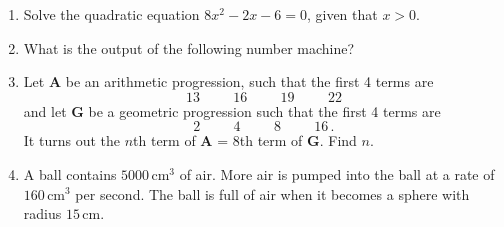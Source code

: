 \documentclass[12pt,a4paper]{article}
\begin{document}
\begin{enumerate}
    \item Solve the quadratic equation $8x^2 - 2x - 6 = 0$, given that $x > 0$.
    
    \vspace{3cm}

    \item What is the output of the following number machine?
\begin{center}
\end{center}


\vspace{3cm}

    \item Let $\mathbf{A}$ be an arithmetic progression, such that the first 4 terms are
    \begin{equation*}
        13 \hspace{1cm} 16 \hspace{1cm} 19 \hspace{1cm} 22
    \end{equation*}
   and let $\mathbf{G}$ be a geometric progression such that the first 4 terms are
   \begin{equation*}
        2 \hspace{1cm} 4 \hspace{1cm} 8 \hspace{1cm} 16 \, .
    \end{equation*}
   It turns out the $n$th term of $\mathbf{A}$ = 8th term of $\mathbf{G}$. Find $n$.


\vspace{3cm}

   \item A ball contains $5000\,\mathrm{cm}^3$ of air. More air is pumped into the ball at a rate of $160\,\mathrm{cm}^3$ per second. The ball is full of air when it becomes a sphere with radius $15\,\mathrm{cm}$.


\end{enumerate}
\end{document}

